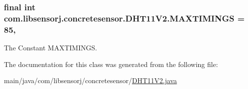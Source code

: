 \subsubsection[{M\+A\+X\+T\+I\+M\+I\+N\+G\+S}]{\setlength{\rightskip}{0pt plus 5cm}final int com.\+libsensorj.\+concretesensor.\+D\+H\+T11\+V2.\+M\+A\+X\+T\+I\+M\+I\+N\+G\+S = 85\hspace{0.3cm}{\ttfamily [static]}, {\ttfamily [private]}}\label{classcom_1_1libsensorj_1_1concretesensor_1_1DHT11V2_ad64749b474c180fea185aecd512eb656}
The Constant M\+A\+X\+T\+I\+M\+I\+N\+G\+S. 

The documentation for this class was generated from the following file\+:\begin{DoxyCompactItemize}
\item 
main/java/com/libsensorj/concretesensor/\hyperlink{DHT11V2_8java}{D\+H\+T11\+V2.\+java}\end{DoxyCompactItemize}
